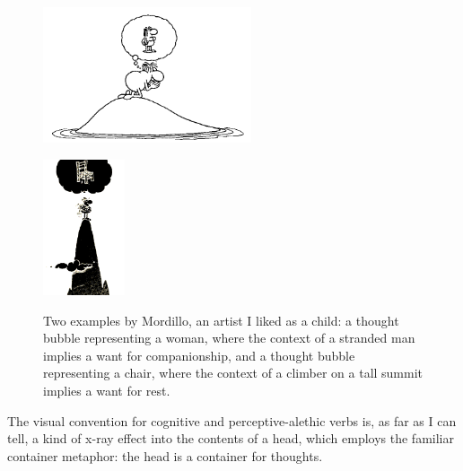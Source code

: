 \begin{figure}[h!]
    \centering
    \begin{minipage}[b]{0.4\textwidth}
        \centering
        \includegraphics[height=4cm]{figures/bubbles/companion}
        \label{fig:companion}
    \end{minipage}
    \hfill
    \begin{minipage}[b]{0.4\textwidth}
        \centering
        \includegraphics[height=4cm]{figures/bubbles/chair}
        \label{fig:chair}
    \end{minipage}
    \caption{Two examples by Mordillo, an artist I liked as a child: a thought bubble representing a woman, where the context of a stranded man implies a want for companionship, and a thought bubble representing a chair, where the context of a climber on a tall summit implies a want for rest.}
    \label{fig:mordillo}
\end{figure}

The visual convention for cognitive and perceptive-alethic verbs is, as far as I can tell, a kind of x-ray effect into the contents of a head, which employs the familiar container metaphor: the head is a container for thoughts.

